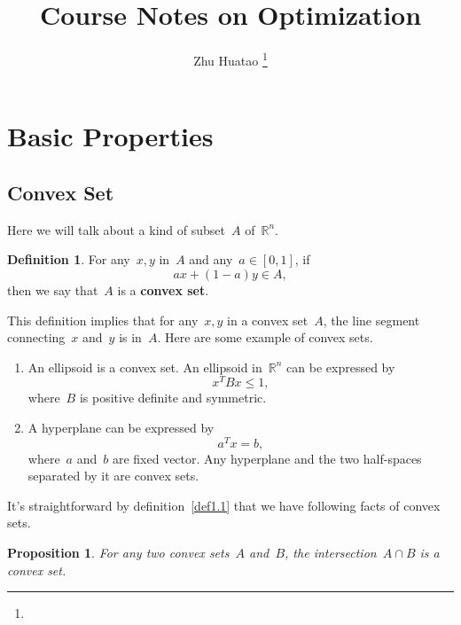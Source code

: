 \documentclass[12pt,a4paper,draft]{article}  %
\title{Course Notes on Optimization}
\date{\DTMnow}
\author{
    Zhu Huatao
    \thanks{}
}
\newtheorem{proposition}{Proposition}[section]
\theoremstyle{definition}
\newtheorem{definition}{Definition}[section]
\numberwithin{equation}{section}
\newcommand{\RR}{\mathbb{R}}
\begin{document}
\maketitle



\section{Basic Properties}

\subsection{Convex Set}

Here we will talk about a kind of subset~$A$ of~$\RR^n$.

\begin{definition} \label{def1.1}
    For any~$x,y$ in~$A$ and any~$a \in \left[ 0,1 \right]$, if 
    \[
    a x + (1-a) y \in A,
    \]
    then we say that~$A$ is a \textbf{convex set}.
\end{definition}

This definition implies that for any~$x,y$ in a convex set~$A$, the line segment connecting~$x$ and~$y$
is in~$A$. Here are some example of convex sets.

\begin{enumerate}
    \item An ellipsoid is a convex set. An ellipsoid in~$\RR^n$ can be expressed by
    $$ x^T B x \leq 1, $$
    where~$B$ is positive definite and symmetric.

    \item A hyperplane can be expressed by
    $$ a^T x = b, $$
    where~$a$ and~$b$ are fixed vector.
    Any hyperplane and the two half-spaces separated by it are convex sets.

\end{enumerate}

It's straightforward by definition~\eqref{def1.1} that we have following facts of convex sets.

\begin{proposition}
    For any two convex sets~$A$ and~$B$, the intersection~$A \cap B$ is a convex set.
\end{proposition}
\end{document}
